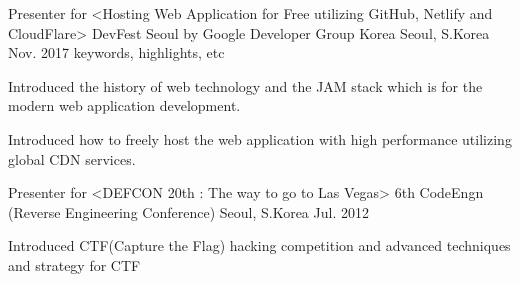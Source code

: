 

\begin{cventries}

  \cventry
    {Presenter for <Hosting Web Application for Free utilizing GitHub, Netlify and CloudFlare>} %
    {DevFest Seoul by Google Developer Group Korea} %
    {Seoul, S.Korea} %
    {Nov. 2017} %
    {keywords, highlights, etc} %
    {
      \begin{cvitems} %
        \item {Introduced the history of web technology and the JAM stack which is for the modern web application development.}
        \item {Introduced how to freely host the web application with high performance utilizing global CDN services.}
      \end{cvitems}
    }

  \cventry
    {Presenter for <DEFCON 20th : The way to go to Las Vegas>} %
    {6th CodeEngn (Reverse Engineering Conference)} %
    {Seoul, S.Korea} %
    {Jul. 2012} %
    {} %
    {
      \begin{cvitems} %
        \item {Introduced CTF(Capture the Flag) hacking competition and advanced techniques and strategy for CTF}
      \end{cvitems}
    }

\end{cventries}
